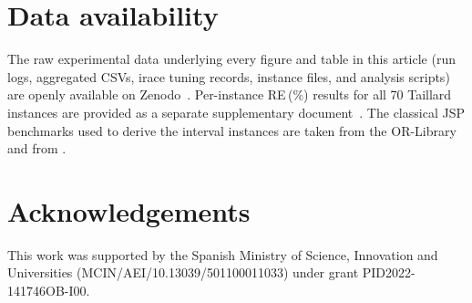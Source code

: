\documentclass[preprint,12pt]{elsarticle}
\begin{document}
\section*{Data availability}

The raw experimental data underlying every figure and table in this article (run logs, aggregated CSVs, irace tuning records, instance files, and analysis scripts) are openly available on Zenodo~\cite{DiazData2026}. Per-instance RE\,(\%) results for all 70 Taillard instances are provided as a separate supplementary document~\cite{DiazSupp2026}. The classical JSP benchmarks used to derive the interval instances are taken from the OR-Library and from \cite{TaillardBKS}.


\section*{Acknowledgements}

This work was supported by the Spanish Ministry of Science, Innovation and Universities (MCIN/AEI/10.13039/501100011033) under grant PID2022-141746OB-I00.





\end{document}
